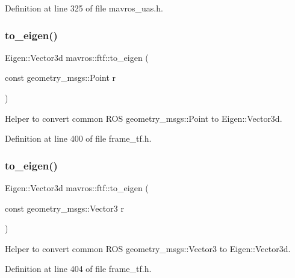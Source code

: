 Definition at line 325 of file mavros\+\_\+uas.\+h.

\mbox{\label{group__nodelib_ga2bd453f7d2dafb3814b5312e788e2e35}} 
\subsubsection{\texorpdfstring{to\_eigen()}{to\_eigen()}\hspace{0.1cm}{\footnotesize\ttfamily [1/3]}}
{\footnotesize\ttfamily Eigen\+::\+Vector3d mavros\+::ftf\+::to\+\_\+eigen (\begin{DoxyParamCaption}\item[{const geometry\+\_\+msgs\+::\+Point}]{r }\end{DoxyParamCaption})\hspace{0.3cm}{\ttfamily [inline]}}



Helper to convert common R\+OS geometry\+\_\+msgs\+::\+Point to Eigen\+::\+Vector3d. 



Definition at line 400 of file frame\+\_\+tf.\+h.

\mbox{\label{group__nodelib_gaa967b677c7a130cb95621988a4987fab}} 
\subsubsection{\texorpdfstring{to\_eigen()}{to\_eigen()}\hspace{0.1cm}{\footnotesize\ttfamily [2/3]}}
{\footnotesize\ttfamily Eigen\+::\+Vector3d mavros\+::ftf\+::to\+\_\+eigen (\begin{DoxyParamCaption}\item[{const geometry\+\_\+msgs\+::\+Vector3}]{r }\end{DoxyParamCaption})\hspace{0.3cm}{\ttfamily [inline]}}



Helper to convert common R\+OS geometry\+\_\+msgs\+::\+Vector3 to Eigen\+::\+Vector3d. 



Definition at line 404 of file frame\+\_\+tf.\+h.

\mbox{\label{group__nodelib_gab3357177e153e9bc233d96ac595c6a5f}} 
